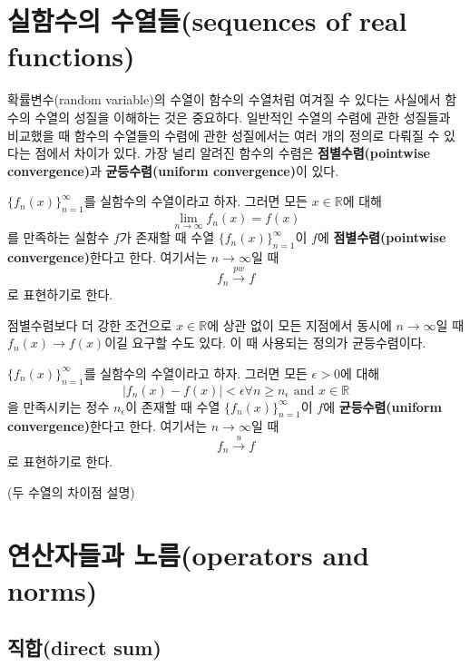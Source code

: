 \documentclass[b5paper,]{scrbook}
\theoremstyle{plain}
\theoremstyle{definition}
\numberwithin{equation}{section}
\let\BeginKnitrBlock\begin \let\EndKnitrBlock\end
\begin{document}
\section{실함수의 수열들(sequences of real
functions)}\label{-sequences-of-real-functions}

확률변수(random variable)의 수열이 함수의 수열처럼 여겨질 수 있다는
사실에서 함수의 수열의 성질을 이해하는 것은 중요하다. 일반적인 수열의
수렴에 관한 성질들과 비교했을 때 함수의 수열들의 수렴에 관한 성질에서는
여러 개의 정의로 다뤄질 수 있다는 점에서 차이가 있다. 가장 널리 알려진
함수의 수렴은 \textbf{점별수렴(pointwise convergence)}과
\textbf{균등수렴(uniform convergence)}이 있다.

\BeginKnitrBlock{definition}[점별수렴]
\protect\hypertarget{def:unnamed-chunk-2}{}{\label{def:unnamed-chunk-2}
{} }\(\{ f_{n}(x)\}_{n=1}^{\infty}\)를 실함수의
수열이라고 하자. 그러면 모든 \(x\in\mathbb{R}\)에 대해
\[\lim_{n\rightarrow \infty}f_{n}(x)=f(x)\] 를 만족하는 실함수 \(f\)가
존재할 때 수열 \(\{ f_{n}(x)\}_{n=1}^{\infty}\)이 \(f\)에
\textbf{점별수렴(pointwise convergence)}한다고 한다. 여기서는
\(n\rightarrow \infty\)일 때 \[f_{n} \stackrel{pw}{\rightarrow} f\] 로
표현하기로 한다.
\EndKnitrBlock{definition}

점별수렴보다 더 강한 조건으로 \(x \in \mathbb{R}\)에 상관 없이 모든
지점에서 동시에 \(n\rightarrow\infty\)일 때
\(f_{n}(x) \rightarrow f(x)\)이길 요구할 수도 있다. 이 때 사용되는
정의가 균등수렴이다.

\BeginKnitrBlock{definition}[균등수렴]
\protect\hypertarget{def:unnamed-chunk-3}{}{\label{def:unnamed-chunk-3}
{} }\(\{ f_{n}(x)\}_{n=1}^{\infty}\)를 실함수의
수열이라고 하자. 그러면 모든 \(\epsilon > 0\)에 대해
\[|f_{n}(x)-f(x)| <\epsilon \forall n \geq n_{\epsilon} \text{ and } x\in \mathbb{R}\]
을 만족시키는 정수 \(n_{\epsilon}\)이 존재할 때 수열
\(\{ f_{n}(x)\}_{n=1}^{\infty}\)이 \(f\)에 \textbf{균등수렴(uniform
convergence)}한다고 한다. 여기서는 \(n\rightarrow \infty\)일 때
\[f_{n} \stackrel{u}{\rightarrow} f\] 로 표현하기로 한다.
\EndKnitrBlock{definition}

(두 수열의 차이점 설명)

\section{연산자들과 노름(operators and
norms)}\label{-operators-and-norms}

\subsection{직합(direct sum)}\label{direct-sum}
\end{document}
